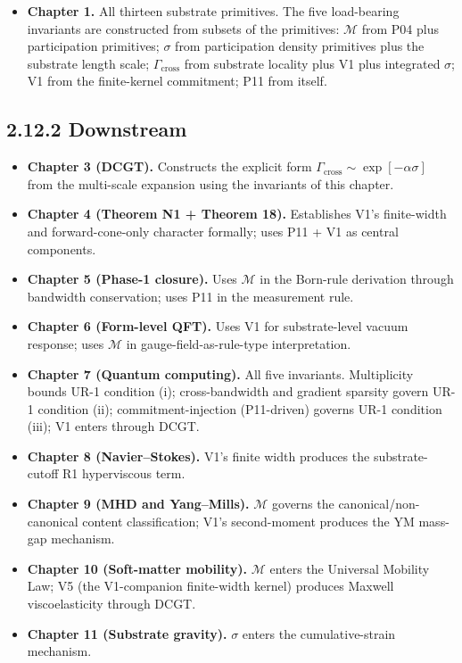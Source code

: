 \documentclass[11pt]{book}
\begin{document}
\begin{itemize}
\item \textbf{Chapter 1.} All thirteen substrate primitives. The five load-bearing invariants are constructed from subsets of the primitives: $\mathcal{M}$ from P04 plus participation primitives; $\sigma$ from participation density primitives plus the substrate length scale; $\Gamma_\mathrm{cross}$ from substrate locality plus V1 plus integrated $\sigma$; V1 from the finite-kernel commitment; P11 from itself.
\end{itemize}

\subsection{2.12.2 Downstream}

\begin{itemize}
\item \textbf{Chapter 3 (DCGT).} Constructs the explicit form $\Gamma_\mathrm{cross} \sim \exp[-\alpha\sigma]$ from the multi-scale expansion using the invariants of this chapter.
\item \textbf{Chapter 4 (Theorem N1 + Theorem 18).} Establishes V1's finite-width and forward-cone-only character formally; uses P11 + V1 as central components.
\item \textbf{Chapter 5 (Phase-1 closure).} Uses $\mathcal{M}$ in the Born-rule derivation through bandwidth conservation; uses P11 in the measurement rule.
\item \textbf{Chapter 6 (Form-level QFT).} Uses V1 for substrate-level vacuum response; uses $\mathcal{M}$ in gauge-field-as-rule-type interpretation.
\item \textbf{Chapter 7 (Quantum computing).} All five invariants. Multiplicity bounds UR-1 condition (i); cross-bandwidth and gradient sparsity govern UR-1 condition (ii); commitment-injection (P11-driven) governs UR-1 condition (iii); V1 enters through DCGT.
\item \textbf{Chapter 8 (Navier–Stokes).} V1's finite width produces the substrate-cutoff R1 hyperviscous term.
\item \textbf{Chapter 9 (MHD and Yang–Mills).} $\mathcal{M}$ governs the canonical/non-canonical content classification; V1's second-moment produces the YM mass-gap mechanism.
\item \textbf{Chapter 10 (Soft-matter mobility).} $\mathcal{M}$ enters the Universal Mobility Law; V5 (the V1-companion finite-width kernel) produces Maxwell viscoelasticity through DCGT.
\item \textbf{Chapter 11 (Substrate gravity).} $\sigma$ enters the cumulative-strain mechanism.

\end{itemize}
\end{document}
